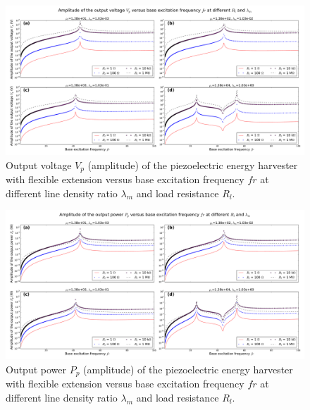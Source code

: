 \documentclass{elsarticle}
\begin{document}
\begin{figure}[!htbp]
    \centering
    \includegraphics[width=\textwidth]{./fig_output_voltage_vs_fr_Rl_lamm_all}
    \caption{Output voltage $V_p$ (amplitude) of the piezoelectric energy harvester with flexible extension versus base excitation frequency $fr$ at different line density ratio $\lambda_m$ and load resistance $R_l$.}
    \label{fig:fig_output_voltage_vs_fr_Rl_lamm_all}
\end{figure}

\begin{figure}[!htbp]
    \centering
    \includegraphics[width=\textwidth]{./fig_output_power_vs_fr_Rl_lamm_all}
    \caption{Output power $P_p$ (amplitude) of the piezoelectric energy harvester with flexible extension versus base excitation frequency $fr$ at different line density ratio $\lambda_m$ and load resistance $R_l$.}
    \label{fig:fig_output_power_vs_fr_Rl_lamm_all}
\end{figure}
\end{document}

